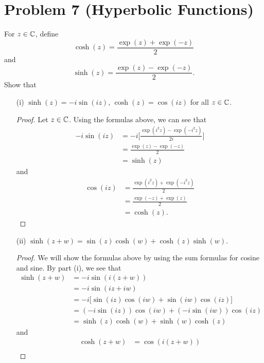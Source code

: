 \documentclass[a4paper]{article}
\begin{document}
\section*{Problem 7 (Hyperbolic Functions)}
For \( z \in \mathbb{C}  \), define 
\[  \cosh(z) = \frac{ \exp(z) + \exp(-z) }{ 2 }  \]
and
\[  \sinh(z) = \frac{ \exp(z) - \exp(-z) }{ 2 }.  \]
Show that 
\begin{enumerate}
    \item[(i)] \( \sinh(z) = -i \sin(iz) \), \( \cosh(z) = \cos(iz) \) for all \( z \in \mathbb{C}  \).
        \begin{proof}
        Let \( z \in \mathbb{C}  \). Using the formulas above, we can see that
        \begin{align*}
            -i \sin (iz) &= -i \Bigg[ \frac{ \exp(i^{2} z) - \exp(-i^{2}z) }{ 2i } \Bigg] \\
                         &= \frac{ \exp(z) - \exp(-z) }{ 2 } \\
                         &= \sinh(z)
        \end{align*}
        and
        \begin{align*}
            \cos(iz) &= \frac{ \exp(i^{2} z) + \exp(- i^{2} z) }{ 2 }  \\
                     &= \frac{ \exp(-z) + \exp(z) }{ 2 } \\
                     &= \cosh(z).
        \end{align*}
        \end{proof}
    \item[(ii)] \( \sinh(z+w) = \sin(z) \cosh(w) + \cosh(z) \sinh(w) \).
        \begin{proof}
            We will show the formulas above by using the sum formulas for cosine and sine. By part (i), we see that
            \begin{align*}
                \sinh(z+w) &= -i \sin(i (z+w)) \\
                           &= -i \sin (iz + iw) \\
                           &= -i \Big[ \sin(iz) \cos(iw) + \sin(iw) \cos(iz) \Big] \\
                           &= (  - i \sin(iz) ) \cos(iw) + (-i \sin(iw)) \cos(iz) \\
                           &= \sinh(z) \cosh(w) + \sinh(w) \cosh(z)
            \end{align*}
            and
            \begin{align*}
                \cosh(z+w) &= \cos(i(z+w)) \\

\end{align*}
\end{proof}
\end{enumerate}
\end{document}

